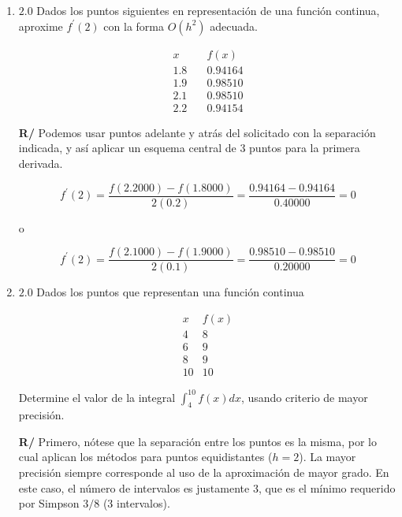 \documentclass[12pt]{article}
\begin{document}
\vspace{-.5cm}
  \begin{enumerate}[leftmargin=*,widest=9]
  
     \item \(2.0\) Dados los puntos siguientes en representación de una función continua, aproxime \(f^\prime(2)\) con la forma \(O(h^2)\) adecuada.
     
     \[
     \begin{array}{lr}
     x  & f(x)\\
     1.8 \quad & 0.94164\\
     1.9 & 0.98510\\
     2.1 & 0.98510\\
     2.2 & 0.94154
     \end{array}
     \]
     
         \textbf{R/} Podemos usar puntos adelante y atrás del solicitado con la separación indicada, y así aplicar un esquema central de 3 puntos para la primera derivada.
    
    \[
    f^\prime(2) = \frac{f(2.2000) - f(1.8000)}{2(0.2)} = \frac{0.94164 - 0.94164}{0.40000} = 0
    \]
    
    \hspace{5cm} o
    
    \[
    f^\prime(2) = \frac{f(2.1000) - f(1.9000)}{2(0.1)} = \frac{0.98510 - 0.98510}{0.20000} = 0
    \]
     
    \item \(2.0\) Dados los puntos que representan una función continua
    
    \[
    \begin{array}{lr}
    x & f(x)\\
    4 & 8\\
    6 & 9\\
    8 & 9\\
    10 & 10   
    \end{array}
    \]
    
    Determine el valor de la integral \( \int^{10}_4 f(x)dx\), usando criterio de mayor precisión.
    
\textbf{R/} Primero, nótese que la separación entre los puntos es la misma, por lo cual aplican los métodos para puntos equidistantes (\(h=2\)). La mayor precisión siempre corresponde al uso de la aproximación de mayor grado. En este caso, el número de intervalos es justamente 3, que es el mínimo requerido por Simpson \(3/8\) (3 intervalos).


\end{enumerate}
\end{document}
